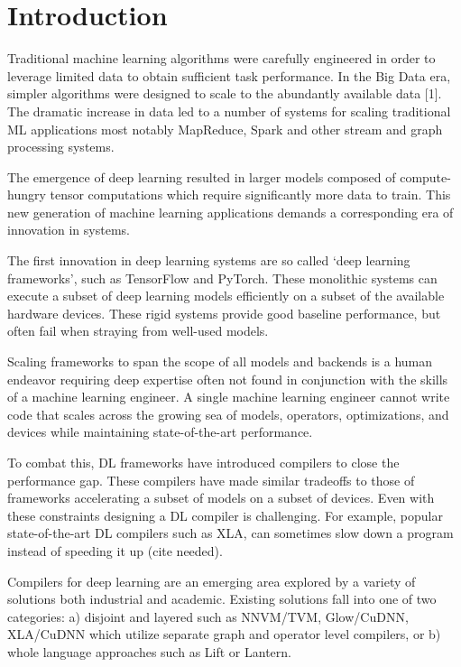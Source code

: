 \chapter{Introduction}
\label{ch:intro}

Traditional machine learning algorithms were carefully engineered in order to leverage limited data to obtain sufficient task performance. In the Big Data era, simpler algorithms were designed to scale to the abundantly available data [1]. The dramatic increase in data led to a number of systems for scaling traditional ML applications most notably MapReduce, Spark and other stream and graph processing systems.

The emergence of deep learning resulted in larger models composed of compute-hungry tensor computations which require significantly more data to train. This new generation of machine learning applications demands a corresponding era of innovation in systems.

The first innovation in deep learning systems are so called ‘deep learning frameworks’, such as TensorFlow and PyTorch. These monolithic systems can execute a subset of deep learning models efficiently on a subset of the available hardware devices. These rigid systems provide good baseline performance, but often fail when straying from well-used models.

Scaling frameworks to span the scope of all models and backends is a human endeavor requiring deep expertise often not found in conjunction with the skills of a machine learning engineer. A single machine learning engineer cannot write code that scales across the growing sea of models, operators, optimizations, and devices while maintaining state-of-the-art performance.

To combat this, DL frameworks have introduced compilers to close the performance gap. These compilers have made similar tradeoffs to those of frameworks accelerating a subset of models on a subset of devices. Even with these constraints designing a DL compiler is challenging.
For example, popular state-of-the-art DL compilers such as XLA, can sometimes slow down a program instead of speeding it up (cite needed).

Compilers for deep learning are an emerging area explored by a variety of solutions both industrial and academic. Existing solutions fall into one of two categories: a) disjoint and layered such as NNVM/TVM, Glow/CuDNN, XLA/CuDNN which utilize separate graph and operator level compilers, or b) whole language approaches such as Lift or Lantern.

